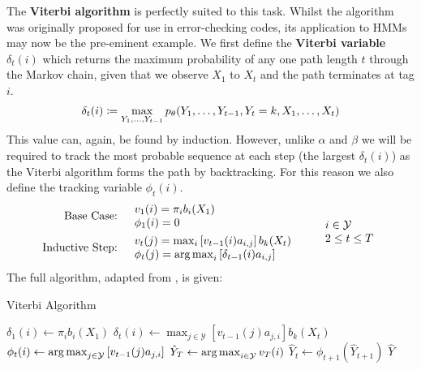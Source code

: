 \documentclass[../main.tex]{subfiles}
\begin{document}
The \textbf{Viterbi algorithm} \autocite{viterbi-1967} is perfectly suited to this task. Whilst the algorithm was originally proposed for use in error-checking codes, its application to HMMs may now be the pre-eminent example.
We first define the \textbf{Viterbi variable} $\delta_t(i)$ which returns the maximum probability of any one path length $t$ through the Markov chain, given that we observe $X_1$ to $X_t$ and the path terminates at tag $i$.
\begin{equation*} \label{eq:viterbi-var}
    \delta_t(i) \coloneqq \max_{Y_1, \ldots, Y_{t-1}}p_\theta(Y_1, \ldots, Y_{t-1}, Y_t = k, X_1, \ldots, X_t)
\end{equation*}
This value can, again, be found by induction. However, unlike $\alpha$ and $\beta$ we will be required to track the most probable sequence at each step (the largest $\delta_t(i)$) as the Viterbi algorithm forms the path by backtracking. For this reason we also define the tracking variable $\phi_t(i)$.
\begin{equation*}
    \begin{aligned}
        \text{Base Case:} & \quad \begin{array}{lr}
                                        v_1(i) = \pi_i b_i(X_1) \\
                                        \phi_1(i) = 0
                                    \end{array} \\
        \text{Inductive Step:} & \quad \begin{array}{lr}
                                            v_{t}(j) = \max_i \left[ v_{t-1}(i) a_{i,j} \right] b_k(X_t) \\
                                            \phi_t(j) = \operatorname*{arg\,max}_i \left[ \delta_{t-1}(i) a_{i,j} \right]
                                        \end{array}
    \end{aligned} \qquad 
        \begin{array}{lr}
            i \in \mathcal{Y} \\
            2 \leq t \leq T
        \end{array}
\end{equation*}
The full algorithm, adapted from \autocite{eisenstein-nlp-2019, rabiner-1989-tutorial}, is given:
\begin{algorithm}
\caption{Viterbi Algorithm} \label{alg:Viterbi}
\begin{algorithmic}
    \State $\delta_1(i) \gets \pi_i b_i(X_1)$
\EndFor
{}
    \State $\delta_t(i) \gets \max_{j \in \mathcal{Y}} \left[ v_{t-1}(j) a_{j,i} \right] b_k(X_t)$
    \State $\phi_t(i) \gets \operatorname*{arg\,max}_{j \in \mathcal{Y}} \left[ v_{t-1}(j) a_{j,i} \right]$
\EndFor
\EndFor
\State $\hat{Y}_T \gets \operatorname*{arg\,max}_{i \in \mathcal{Y}} v_T(i)$
    \State $\hat{Y}_t \gets \phi_{t+1}(\hat{Y}_{t+1})$
\EndFor
\State \Return $\hat{Y}$
\end{algorithmic}
\end{algorithm}
\end{document}
